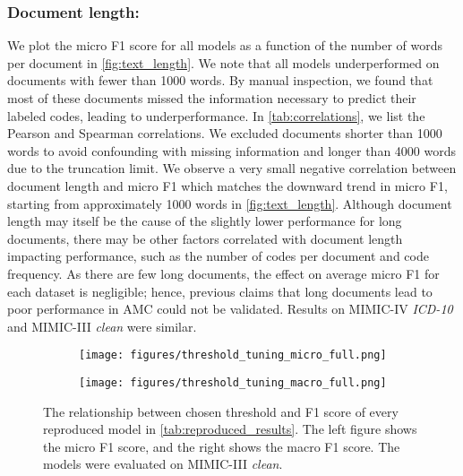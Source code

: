 \documentclass[anonymous=false, sigconf=true, review=false, natbib=true]{acmart}
\begin{document}
\subsubsection{Document length:}\label{subsubsec:document-length}



We plot the micro F1 score for all models as a function of the number of words per document in \cref{fig:text_length}. 
We note that all models underperformed on documents with fewer than 1000 words. 
By manual inspection, we found that most of these documents missed the information necessary to predict their labeled codes, leading to underperformance. 
In \cref{tab:correlations}, we list the Pearson and Spearman correlations. We excluded documents shorter than 1000 words to avoid confounding with missing information and longer than 4000 words due to the truncation limit. We observe a very small negative correlation between document length and micro F1 which matches the downward trend in micro F1, starting from approximately 1000 words in \cref{fig:text_length}. 
Although document length may itself be the cause of the slightly lower performance for long documents, there may be other factors correlated with document length impacting performance, such as the number of codes per document and code frequency.
As there are few long documents, the effect on average micro F1 for each dataset is negligible; hence, previous claims that long documents lead to poor performance in AMC could not be validated. Results on MIMIC-IV \textit{ICD-10} and MIMIC-III \textit{clean} were similar.



\begin{figure*}[t]
    \centering
    \begin{subfigure}[b]{0.44\textwidth}
        \centering
        \texttt{[image: figures/threshold\_tuning\_micro\_full.png]}
\end{subfigure}
    \hspace{10mm}
    \begin{subfigure}[b]{0.44\textwidth}
        \centering
        \texttt{[image: figures/threshold\_tuning\_macro\_full.png]}
\end{subfigure}
    \caption{The relationship between chosen threshold and F1 score of every reproduced model in \cref{tab:reproduced_results}. The left figure shows the micro F1 score, and the right shows the macro F1 score. The models were evaluated on MIMIC-III \textit{clean}.}
    \label{fig:threshold_tuning}
\end{figure*}
\end{document}

